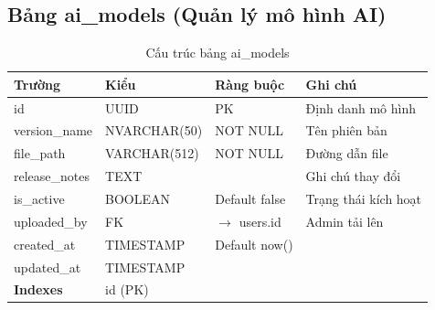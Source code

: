 \documentclass[12pt,a4paper]{article}
\begin{document}
\subsection{Bảng ai\_models (Quản lý mô hình AI)}
\begin{longtable}{|l|l|l|p{5.5cm}|}
    \caption{Cấu trúc bảng ai\_models}                                                              \\
    \hline
    \rowcolor{headerblue}
    \textbf{Trường}  & \textbf{Kiểu}                & \textbf{Ràng buộc}     & \textbf{Ghi chú}     \\
    \hline
    id               & UUID                         & PK                     & Định danh mô hình    \\
    \hline
    version\_name    & NVARCHAR(50)                 & NOT NULL               & Tên phiên bản        \\
    \hline
    file\_path       & VARCHAR(512)                 & NOT NULL               & Đường dẫn file       \\
    \hline
    release\_notes   & TEXT                         &                        & Ghi chú thay đổi     \\
    \hline
    is\_active       & BOOLEAN                      & Default false          & Trạng thái kích hoạt \\
    \hline
    uploaded\_by     & FK                           & $\rightarrow$ users.id & Admin tải lên        \\
    \hline
    created\_at      & TIMESTAMP                    & Default now()          &                      \\
    \hline
    updated\_at      & TIMESTAMP                    &                        &                      \\
    \hline
    \rowcolor{headerblue}
    \textbf{Indexes} & \multicolumn{3}{l|}{id (PK)}                                                 \\
    \hline
\end{longtable}
\end{document}
